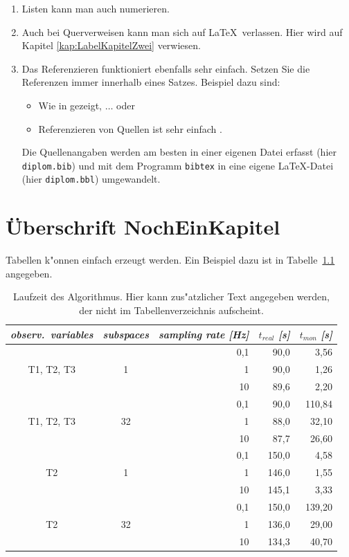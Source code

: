 \documentclass[11pt]{report}
\begin{document}
\begin{enumerate}
\item Listen kann man auch numerieren.
\item Auch bei Querverweisen kann man sich auf \LaTeX\ verlassen. 
Hier wird auf Kapitel \ref{kap:LabelKapitelZwei} verwiesen.
\item Das Referenzieren funktioniert ebenfalls sehr einfach.  Setzen Sie die
Referenzen immer innerhalb eines Satzes.  Beispiel dazu sind:
\begin{itemize}
\item Wie in \cite{Voas97} gezeigt, $\ldots$ oder
\item Referenzieren von Quellen ist sehr einfach \cite{Kui94}.
\end{itemize}
Die Quellenangaben werden am besten in einer eigenen Datei erfasst 
(hier {\tt diplom.bib}) und mit dem Programm {\tt bibtex} in eine
eigene \LaTeX -Datei (hier {\tt diplom.bbl}) umgewandelt.
\end{enumerate}



\chapter{\"{U}berschrift NochEinKapitel}
   \label{kap:NochEinKapitel}

Tabellen k"onnen einfach erzeugt werden.  Ein Beispiel dazu ist
in Tabelle~\ref{tab1} angegeben.

\begin{table}[h!]
\centering
\begin{tabular}{|c|c|r|r|r|}\hline\hline
{\em observ.~variables} & {\em subspaces} & {\em sampling rate [Hz]} &
$t_{real}$ {\em [s]} & $t_{mon}$ {\em [s]}\\ \hline
           &    & 0,1 &  90,0 &  3,56  \\ \cline{3-5}
T1, T2, T3 &  1 & 1   &  90,0 &  1,26  \\ \cline{3-5}
           &    & 10  &  89,6 &  2,20  \\ \hline
           &    & 0,1 &  90,0 &110,84  \\ \cline{3-5}
T1, T2, T3 & 32 & 1   &  88,0 & 32,10  \\ \cline{3-5}
           &    & 10  &  87,7 & 26,60  \\ \hline
           &    & 0,1 & 150,0 &  4,58  \\ \cline{3-5}
T2         &  1 & 1   & 146,0 &  1,55  \\ \cline{3-5}
           &    & 10  & 145,1 &  3,33  \\ \hline
           &    & 0,1 & 150,0 &139,20  \\ \cline{3-5}
T2         & 32 & 1   & 136,0 & 29,00  \\ \cline{3-5}
           &    & 10  & 134,3 & 40,70 \\ \hline\hline
\end{tabular}
\caption[Laufzeit des Algorithmus.]
{Laufzeit des Algorithmus.  Hier kann zus"atzlicher Text angegeben werden,
der nicht im Tabellenverzeichnis aufscheint.}  
\label{tab1}
\end{table}
\end{document}
